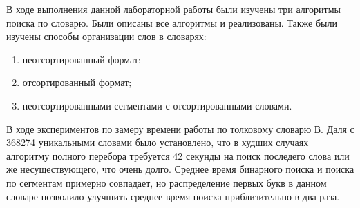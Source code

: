 \Conclusion
    В ходе выполнения данной лабораторной работы были изучены три алгоритмы поиска по словарю.
    Были описаны все алгоритмы и реализованы. 
    Также были изучены способы организации слов в словарях:
    \begin{enumerate}
        \item неотсортированный формат;
        \item отсортированный формат;
        \item неотсортированными сегментами с отсортированными словами.
    \end{enumerate}
    
    В ходе экспериментов по замеру времени работы по толковому словарю
    В. Даля с 368274 уникальными словами было установлено, что 
    в худших случаях алгоритму полного перебора требуется 42 секунды 
    на поиск последего слова или же несуществующего, что очень долго.
    Среднее время бинарного поиска и поиска по сегментам примерно совпадает,
    но распределение первых букв в данном словаре позволило 
    улучшить среднее время поиска приблизительно в два раза.

